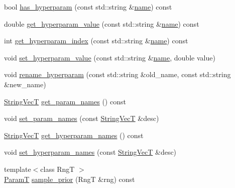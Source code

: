 \begin{DoxyCompactItemize}
\item 
bool \hyperlink{classmappel_1_1PointEmitterModel_afba2b17a81a506b0acd41616c8604412}{has\+\_\+hyperparam} (const std\+::string \&\hyperlink{classmappel_1_1Gauss1DMLE_a3a9dfff075fc614cceb82b9665b226c5}{name}) const 
\item 
double \hyperlink{classmappel_1_1PointEmitterModel_a3282cc59d5c6010a51f671ba72997705}{get\+\_\+hyperparam\+\_\+value} (const std\+::string \&\hyperlink{classmappel_1_1Gauss1DMLE_a3a9dfff075fc614cceb82b9665b226c5}{name}) const 
\item 
int \hyperlink{classmappel_1_1PointEmitterModel_ae13aa99689266d870b659d1045d595f1}{get\+\_\+hyperparam\+\_\+index} (const std\+::string \&\hyperlink{classmappel_1_1Gauss1DMLE_a3a9dfff075fc614cceb82b9665b226c5}{name}) const 
\item 
void \hyperlink{classmappel_1_1PointEmitterModel_ade3e56cc00c43e9b7a521d8c4778d3b7}{set\+\_\+hyperparam\+\_\+value} (const std\+::string \&\hyperlink{classmappel_1_1Gauss1DMLE_a3a9dfff075fc614cceb82b9665b226c5}{name}, double value)
\item 
void \hyperlink{classmappel_1_1PointEmitterModel_a447c83f0769e6dea2bfad68d957287d0}{rename\+\_\+hyperparam} (const std\+::string \&old\+\_\+name, const std\+::string \&new\+\_\+name)
\item 
\hyperlink{namespacemappel_aae88cf18bccfbb789a6019bcfbbfca68}{String\+VecT} \hyperlink{classmappel_1_1PointEmitterModel_aa910d1137d808041c0601f2dd3db96f0}{get\+\_\+param\+\_\+names} () const 
\item 
void \hyperlink{classmappel_1_1PointEmitterModel_a2abccbca47fc60700d73244e6c4dbe30}{set\+\_\+param\+\_\+names} (const \hyperlink{namespacemappel_aae88cf18bccfbb789a6019bcfbbfca68}{String\+VecT} \&desc)
\item 
\hyperlink{namespacemappel_aae88cf18bccfbb789a6019bcfbbfca68}{String\+VecT} \hyperlink{classmappel_1_1PointEmitterModel_a1b8bbd4bdddfb8f5236e8e50fe546c36}{get\+\_\+hyperparam\+\_\+names} () const 
\item 
void \hyperlink{classmappel_1_1PointEmitterModel_a6cdba258bda50cff162dc16a49383bb0}{set\+\_\+hyperparam\+\_\+names} (const \hyperlink{namespacemappel_aae88cf18bccfbb789a6019bcfbbfca68}{String\+VecT} \&desc)
\item 
{\footnotesize template$<$class RngT $>$ }\\\hyperlink{classmappel_1_1PointEmitterModel_a665ec6aea3aac139bb69a23c06d4b9a1}{ParamT} \hyperlink{classmappel_1_1PointEmitterModel_ae69bf3df2c94b351015bbf81e52dfe03}{sample\+\_\+prior} (RngT \&rng) const 

\end{DoxyCompactItemize}
